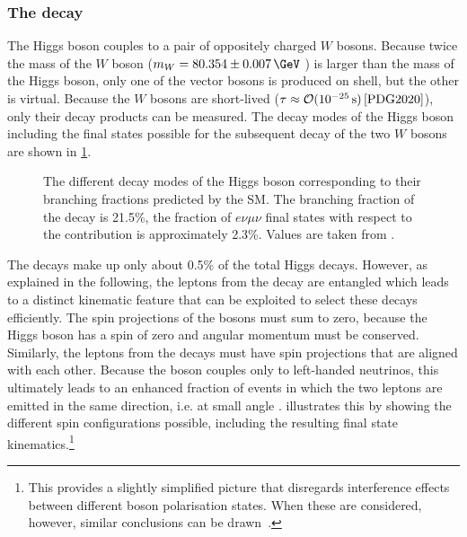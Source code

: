 \subsubsection{The \HWWdet decay}
The Higgs boson couples to a pair of oppositely charged $W$ bosons.
Because twice the mass of the $W$ boson ($m_W = 80.354 \pm 0.007\,\GeV$ \cite{PDG2020}) is larger than the mass of the Higgs boson, only one of the vector bosons is produced on shell, but the other is virtual.
Because the $W$ bosons are short-lived ($\tau \approx \mathcal{O}(10^{-25}\,\text{s})\,\text{\cite{PDG2020}}$), only their decay products can be measured. 
The decay modes of the Higgs boson including the final states possible for the subsequent decay of the two $W$ bosons are shown in \cref{fig:h-branching-ratios}. 
\begin{figure}[th]
    \caption[Branching fraction per decay mode of the Higgs boson.]{The different decay modes of the Higgs boson corresponding to their branching fractions predicted by the SM. The branching fraction of the \HWW decay is 21.5\%, the fraction of $e\nu\mu\nu$ final states with respect to the \HWW contribution is approximately 2.3\%. Values are taken from .}
    \label{fig:h-branching-ratios}
\end{figure}

The \HWWdet decays make up only about 0.5\% of the total Higgs decays. However, as explained in the following, the leptons from the \HWWdet decay are entangled which leads to a distinct kinematic feature that can be exploited to select these decays efficiently.
The spin projections of the \Wboson bosons must sum to zero, because the Higgs boson has a spin of zero and angular momentum must be conserved.
Similarly, the leptons from the \Wboson decays must have spin projections that are aligned with each other. Because the \Wboson boson couples only to left-handed neutrinos, this ultimately leads to an enhanced fraction of \HWWdet events in which the two leptons are emitted in the same direction, i.e. at small angle \dphill.
 illustrates this by showing the different spin configurations possible, including the resulting final state kinematics.\footnote{This provides a slightly simplified picture that disregards interference effects between different \Wboson boson polarisation states. When these are considered, however, similar conclusions can be drawn~\cite{Maina_2021}.}

